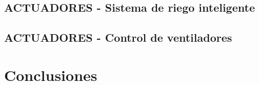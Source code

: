\documentclass{article}
\begin{document}


\subsection{ACTUADORES - Sistema de riego inteligente}



\subsection{ACTUADORES - Control de ventiladores}



\section{Conclusiones}



\end{document}
